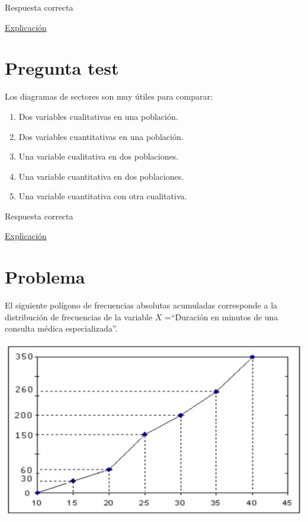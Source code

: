 \documentclass[
]{book}
\providecommand{\tightlist}{%
  \setlength{\itemsep}{0pt}\setlength{\parskip}{0pt}}
\begin{document}
Respuesta correcta

\href{https://1fjmanzano.github.io/bioestadistica/medidas-de-posicio\%CC\%81n-dispersio\%CC\%81n-y-forma.html\#medidas-de-posicio\%CC\%81n-centrales}{Explicación}

\hypertarget{pregunta-test-41}{%
\section{Pregunta test}\label{pregunta-test-41}}

Los diagramas de sectores son muy útiles para comparar:

\begin{enumerate}
\def\labelenumi{\alph{enumi})}
\tightlist
\item
  Dos variables cualitativas en una población.
\item
  Dos variables cuantitativas en una población.
\item
  Una variable cualitativa en dos poblaciones.
\item
  Una variable cuantitativa en dos poblaciones.
\item
  Una variable cuantitativa con otra cualitativa.
\end{enumerate}

Respuesta correcta

\href{https://1fjmanzano.github.io/bioestadistica/diagramas-de-barras-y-sectores.html}{Explicación}

\hypertarget{problema-5}{%
\section{Problema}\label{problema-5}}

El siguiente polígono de frecuencias absolutas acumuladas corresponde a la distribución de frecuencias de la variable \(X\) =``Duración en minutos de una consulta médica especializada''.

\includegraphics[width=19.47in]{img/2_1}
\end{document}
